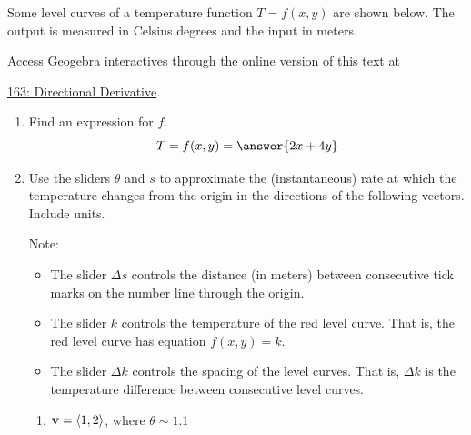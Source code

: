\documentclass{ximera}
\begin{document}
\begin{question}  \label{Ee53efehdhy}

Some level curves of a temperature function $T = f(x,y)$ are shown below. The output is measured in Celsius degrees and the input in meters.

 
\begin{onlineOnly}
    \begin{center}
\end{center}
\end{onlineOnly}

Access Geogebra interactives through the online version of this text at
 
\href{https://www.geogebra.org/classic/htee9xke}{163: Directional Derivative}.


\begin{enumerate}
\item Find an expression for $f$.
\[
     T = f(x,y) = \answer{2x + 4y}
\]

\item Use the sliders $\theta$ and $s$ to approximate the (instantaneous) rate at which the temperature changes from the origin in the directions of the following vectors. Include units.

Note:

\begin{itemize}

\item The slider $\Delta s$ controls the distance (in meters) between consecutive tick marks on the number line through the origin. 

\item The slider $k$ controls the temperature of the red level curve. That is, the red level curve has equation $f(x,y)=k$.

\item The slider $\Delta k$ controls the spacing of the level curves. That is, $\Delta k$ is the temperature difference between consecutive level curves.  

\end{itemize}

\begin{enumerate}

\item ${\bf v} = \langle 1 ,2 \rangle$, where $\theta \sim 1.1$


\end{enumerate}
\end{enumerate}
\end{question}
\end{document}
